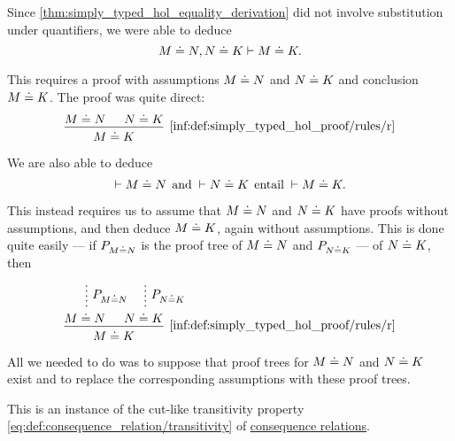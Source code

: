 \begin{remark}\label{rem:simply_typed_hol_syntactic_metalogical_consequence}
  Since \cref{thm:simply_typed_hol_equality_derivation} did not involve substitution under quantifiers, we were able to deduce
  \begin{equation*}
    M \doteq N, N \doteq K \vdash M \doteq K.
  \end{equation*}

  This requires a proof with assumptions \( M \doteq N \) and \( N \doteq K \) and conclusion \( M \doteq K \). The proof was quite direct:
  \begin{equation*}
    \begin{prooftree}
      \hypo{ M \syneq N }
      \hypo{ N \syneq K }
      \infer2[\ref{inf:def:simply_typed_hol_proof/rules/r}]{ M \syneq K }
    \end{prooftree}
  \end{equation*}

  We are also able to deduce
  \begin{equation*}
    \vdash M \syneq N \thinspace \T{and} {}\vdash N \syneq K \thinspace \T{entail} {}\vdash M \syneq K.
  \end{equation*}

  This instead requires us to assume that \( M \doteq N \) and \( N \doteq K \) have proofs without assumptions, and then deduce \( M \doteq K \), again without assumptions. This is done quite easily --- if \( P_{M \doteq N} \) is the proof tree of \( M \doteq N \) and \( P_{N \doteq K} \) --- of \( N \doteq K \), then
  \begin{equation*}
    \begin{prooftree}
      \hypo{}
      \ellipsis { \( P_{M \syneq N} \) } { M \syneq N }

      \hypo{}
      \ellipsis { \( P_{N \syneq K} \) } { N \syneq K }

      \infer2[\ref{inf:def:simply_typed_hol_proof/rules/r}]{ M \syneq K }
    \end{prooftree}
  \end{equation*}

  All we needed to do was to suppose that proof trees for \( M \doteq N \) and \( N \doteq K \) exist and to replace the corresponding assumptions with these proof trees.

  This is an instance of the cut-like transitivity property \eqref{eq:def:consequence_relation/transitivity} of \hyperref[def:consequence_relation]{consequence relations}.


\end{remark}
